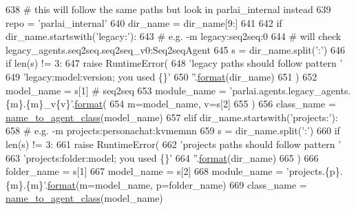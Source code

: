 \begin{DoxyCode}
638         \textcolor{comment}{# this will follow the same paths but look in parlai\_internal instead}
639         repo = \textcolor{stringliteral}{'parlai\_internal'}
640         dir\_name = dir\_name[9:]
641 
642     \textcolor{keywordflow}{if} dir\_name.startswith(\textcolor{stringliteral}{'legacy:'}):
643         \textcolor{comment}{# e.g. -m legacy:seq2seq:0}
644         \textcolor{comment}{# will check legacy\_agents.seq2seq.seq2seq\_v0:Seq2seqAgent}
645         s = dir\_name.split(\textcolor{stringliteral}{':'})
646         \textcolor{keywordflow}{if} len(s) != 3:
647             \textcolor{keywordflow}{raise} RuntimeError(
648                 \textcolor{stringliteral}{'legacy paths should follow pattern '}
649                 \textcolor{stringliteral}{'legacy:model:version; you used \{\}'}
650                 \textcolor{stringliteral}{''}.\hyperlink{namespaceparlai_1_1chat__service_1_1services_1_1messenger_1_1shared__utils_a32e2e2022b824fbaf80c747160b52a76}{format}(dir\_name)
651             )
652         model\_name = s[1]  \textcolor{comment}{# seq2seq}
653         module\_name = \textcolor{stringliteral}{'parlai.agents.legacy\_agents.\{m\}.\{m\}\_v\{v\}'}.\hyperlink{namespaceparlai_1_1chat__service_1_1services_1_1messenger_1_1shared__utils_a32e2e2022b824fbaf80c747160b52a76}{format}(
654             m=model\_name, v=s[2]
655         )
656         class\_name = \hyperlink{namespaceparlai_1_1core_1_1agents_a7a5f5076b35ce376d8b46bfb362bfc53}{name\_to\_agent\_class}(model\_name)
657     \textcolor{keywordflow}{elif} dir\_name.startswith(\textcolor{stringliteral}{'projects:'}):
658         \textcolor{comment}{# e.g. -m projects:personachat:kvmemnn}
659         s = dir\_name.split(\textcolor{stringliteral}{':'})
660         \textcolor{keywordflow}{if} len(s) != 3:
661             \textcolor{keywordflow}{raise} RuntimeError(
662                 \textcolor{stringliteral}{'projects paths should follow pattern '}
663                 \textcolor{stringliteral}{'projects:folder:model; you used \{\}'}
664                 \textcolor{stringliteral}{''}.\hyperlink{namespaceparlai_1_1chat__service_1_1services_1_1messenger_1_1shared__utils_a32e2e2022b824fbaf80c747160b52a76}{format}(dir\_name)
665             )
666         folder\_name = s[1]
667         model\_name = s[2]
668         module\_name = \textcolor{stringliteral}{'projects.\{p\}.\{m\}.\{m\}'}.\hyperlink{namespaceparlai_1_1chat__service_1_1services_1_1messenger_1_1shared__utils_a32e2e2022b824fbaf80c747160b52a76}{format}(m=model\_name, p=folder\_name)
669         class\_name = \hyperlink{namespaceparlai_1_1core_1_1agents_a7a5f5076b35ce376d8b46bfb362bfc53}{name\_to\_agent\_class}(model\_name)

\end{DoxyCode}
